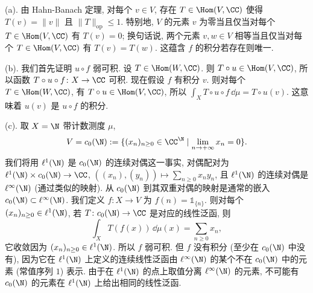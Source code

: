 \begin{solution}
(a). 由 Hahn-Banach 定理, 对每个 $v \in V$, 存在 $T \in \Hom(V, \CC)$ 使得 $T(v) = \|v\|$ 且 $\|T\|_{\mathrm{op}} \leq 1$. 特别地, $V$ 的元素 $v$ 为零当且仅当对每个 $T \in \Hom(V, \CC)$ 有 $T(v) = 0$; 换句话说, 两个元素 $v, w \in V$ 相等当且仅当对每个 $T \in \Hom(V, \CC)$ 有 $T(v) = T(w)$. 这蕴含 $f$ 的积分若存在则唯一.

(b). 我们首先证明 $u \circ f$ 弱可积. 设 $T \in \Hom(W, \CC)$. 则 $T \circ u \in \Hom(V, \CC)$, 所以函数 $T \circ u \circ f \colon X \to \CC$ 可积.
现在假设 $f$ 有积分 $v$. 则对每个 $T \in \Hom(W, \CC)$, 有 $T \circ u \in \Hom(V, \CC)$, 所以 $\int_X T \circ u \circ f\,\dd\mu = T \circ u(v)$. 这意味着 $u(v)$ 是 $u \circ f$ 的积分.

(c). 取 $X = \N$ 带计数测度 $\mu$,
\[
V = c_0(\N) := \{(x_n)_{n \geq 0} \in \CC^{\N} \mid \lim_{n \to +\infty}x_n = 0\}.
\]
我们将用 $\ell^1(\N)$ 是 $c_0(\N)$ 的连续对偶这一事实, 对偶配对为 $\ell^1(\N) \times c_0(\N) \to \CC$, $((x_n), (y_n)) \longmapsto \sum_{n \geq 0}x_ny_n$, 且 $\ell^1(\N)$ 的连续对偶是 $\ell^{\infty}(\N)$ (通过类似的映射). 从 $c_0(\N)$ 到其双重对偶的映射是通常的嵌入 $c_0(\N) \subset \ell^{\infty}(\N)$.
我们定义 $f \colon X \to V$ 为 $f(n) = \mathbb{1}_{\{n\}}$. 则对每个 $(x_n)_{n \geq 0} \in \ell^1(\N)$, 若 $T \colon c_0(\N) \to \CC$ 是对应的线性泛函, 则
\[
\int_X T(f(x))\,\dd\mu(x) = \sum_{n \geq 0}x_n,
\]
它收敛因为 $(x_n)_{n \geq 0} \in \ell^1(\N)$. 所以 $f$ 弱可积. 但 $f$ 没有积分 (至少在 $c_0(\N)$ 中没有), 因为它在 $\ell^1(\N)$ 上定义的连续线性泛函由 $\ell^{\infty}(\N)$ 的某个不在 $c_0(\N)$ 中的元素 (常值序列 $1$) 表示. 由于在 $\ell^1(\N)$ 的点上取值分离 $\ell^{\infty}(\N)$ 的元素, 不可能有 $c_0(\N)$ 的元素在 $\ell^1(\N)$ 上给出相同的线性泛函.
\end{solution}

